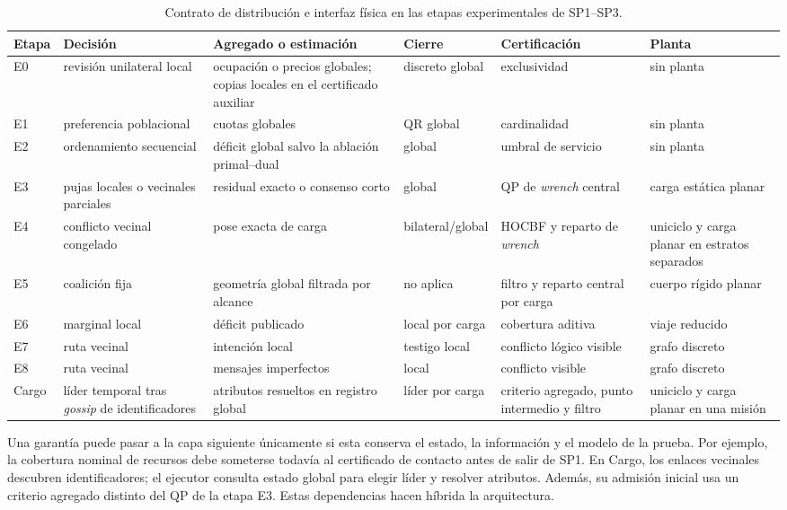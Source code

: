 \begin{table}[!htbp]
 \centering
 \caption{Contrato de distribución e interfaz física en las etapas experimentales de SP1--SP3.}
 \label{tab:results-model-map}
 \scriptsize
 \setlength{\tabcolsep}{2.2pt}
 \renewcommand{\arraystretch}{1.08}
 \begin{tabularx}{\textwidth}{@{}p{0.70cm}p{2.35cm}p{2.70cm}p{2.20cm}p{2.45cm}X@{}}
  \toprule
  Etapa & Decisión & Agregado o estimación & Cierre & Certificación & Planta \\
  \midrule
  E0 & revisión unilateral local & ocupación o precios globales; copias locales en el certificado auxiliar & discreto global & exclusividad & sin planta \\
  E1 & preferencia poblacional & cuotas globales & QR global & cardinalidad & sin planta \\
  E2 & ordenamiento secuencial & déficit global salvo la ablación primal--dual & global & umbral de servicio & sin planta \\
  E3 & pujas locales o vecinales parciales & residual exacto o consenso corto & global & QP de \emph{wrench} central & carga estática planar \\
  E4 & conflicto vecinal congelado & pose exacta de carga & bilateral/global & HOCBF y reparto de \emph{wrench} & uniciclo y carga planar en estratos separados \\
  E5 & coalición fija & geometría global filtrada por alcance & no aplica & filtro y reparto central por carga & cuerpo rígido planar \\
  E6 & marginal local & déficit publicado & local por carga & cobertura aditiva & viaje reducido \\
  E7 & ruta vecinal & intención local & testigo local & conflicto lógico visible & grafo discreto \\
  E8 & ruta vecinal & mensajes imperfectos & local & conflicto visible & grafo discreto \\
  Cargo & líder temporal tras \emph{gossip} de identificadores & atributos resueltos en registro global & líder por carga & criterio agregado, punto intermedio y filtro & uniciclo y carga planar en una misión \\
  \bottomrule
 \end{tabularx}
 \viuownsource
\end{table}

Una garantía puede pasar a la capa siguiente únicamente si esta conserva el estado, la información y el modelo de la prueba. Por ejemplo, la cobertura nominal de recursos debe someterse todavía al certificado de contacto antes de salir de SP1. En Cargo, los enlaces vecinales descubren identificadores; el ejecutor consulta estado global para elegir líder y resolver atributos. Además, su admisión inicial usa un criterio agregado distinto del QP de la etapa E3. Estas dependencias hacen híbrida la arquitectura.


